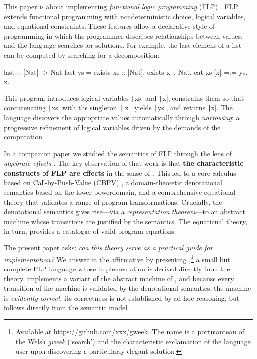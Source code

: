 This paper is about implementing \emph{functional logic programming} (FLP)
\parencite{antoy_2010}. FLP extends functional programming with nondeterministic
choice, logical variables, and equational constraints. These features allow a
declarative style of programming in which the programmer describes relationships
between values, and the language searches for solutions. For example, the last
element of a list can be computed by searching for a decomposition:

\begin{haskellcode}
last :: [Nat] -> Nat
last ys = exists xs :: [Nat]. exists x :: Nat. cat xs [x] =:= ys. x.
\end{haskellcode}

\noindent This program introduces logical variables \texttt|xs| and
\texttt|x|, constrains them so that concatenating
\texttt|xs| with the singleton \texttt|[x]| yields
\texttt|ys|, and returns \texttt|x|. The language
discovers the appropriate values automatically through \emph{narrowing}: a
progressive refinement of logical variables driven by the demands of the
computation.

In a companion paper \parencite{jones_2026} we studied the semantics of FLP
through the lens of \emph{algebraic effects} \parencite{plotkin_2003}. The key
observation of that work is that \textbf{the characteristic constructs of FLP
are effects} in the sense of \citeauthor{plotkin_2003}. This led to a core
calculus based on Call-by-Push-Value (CBPV) \parencite{levy_2003}, a
domain-theoretic denotational semantics based on the lower powerdomain, and a
comprehensive equational theory that validates a range of program
transformations. Crucially, the denotational semantics gives rise---via a
\emph{representation theorem}---to an abstract machine whose transitions are
justified by the semantics. The equational theory, in turn, provides a catalogue
of valid program equations.

The present paper asks: \emph{can this theory serve as a practical guide for
implementation?} We answer in the affirmative by presenting
\Gweek{},\!\footnote{%
  Available at \url{https://github.com/xxx/gweek}. The name is a portmanteau of
  the Welsh \emph{gweek} (`search') and the characteristic exclamation of the
  language user upon discovering a particularly elegant solution.}
a small but complete FLP language whose implementation is derived directly from
the theory. \Gweek{} implements a variant of the abstract machine of
\parencite{jones_2026}, and because every transition of the machine is validated
by the denotational semantics, the machine is \emph{evidently correct}: its
correctness is not established by ad hoc reasoning, but follows directly from
the semantic model.

